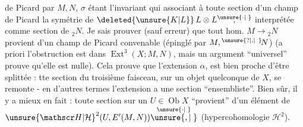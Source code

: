  de Picard  par $M,N$, $\sigma$ étant l'invariant qui  associant à toute section  d'un champ de Picard la symétrie de $\deleted{\unsure{K|L}}\,L\otimes L\overset{\unsure{\cdot|\phantom{\cdot}}}{,}$ interprétée comme section de ${}_{2}N$. Je sais prouver (sauf erreur) que tout hom. $M\to{}_{2}N$ provient d'un champ de Picard convenable (épinglé par $M,{}^{\unsure{?|\text{,}|\phantom{?}}}\!N$) (a priori l'obstruction est dans $\operatorname{Ext}^{3}(X;M,N)$, mais un argument ``universel'' prouve qu'elle est nulle). Cela prouve que l'extension $\alpha$, est bien proche d'être splittée : tte section du troisième faisceau, sur un objet quelconque de $X$, se remonte - en d'autres termes l'extension a une section ``ensembliste''. Bien sûr, il y a mieux en fait : toute section sur un $U\in\operatorname{Ob}X$ ``provient'' d'un élément de ${\unsure{\mathscr H|\mathcal H}}^{2}(U,E'(M,N))\overset{\unsure{\cdot|\phantom{\cdot}}}{\unsure{,|\phantom{,}}}$ (hypercohomologie $\mathscr H^{2}$).
